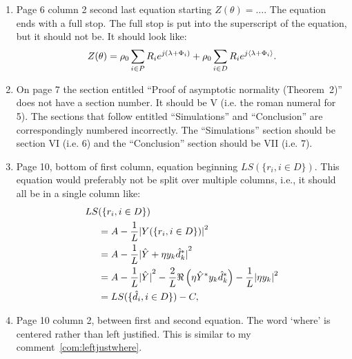 \documentclass[a4paper,10pt]{article}
\begin{document}
\begin{enumerate}
\item Page 6 column 2 second last equation starting $Z(\theta) = \dots$.  The equation ends with a full stop.  The full stop is put into the superscript of the equation, but it should not be.  It should look like:
\[
Z(\theta) = \rho_0 \sum_{i \in P} R_i e^{j(\lambda + \Phi_i)} + \rho_0  \sum_{i \in D} R_i e^{j\langle \lambda + \Phi_i \rangle}.
\]

\item On page 7 the section entitled ``Proof of asymptotic normality (Theorem~2)'' does not have a section number.  It should be V (i.e. the roman numeral for 5).  The sections that follow entitled ``Simulations'' and ``Conclusion'' are correspondingly numbered incorrectly.  The ``Simulations'' section should be section VI (i.e. 6) and the ``Conclusion'' section should be VII (i.e. 7). 

\item Page 10, bottom of first column, equation beginning $LS(\{r_i, i \in D\})$.  This equation would preferably not be split over multiple columns, i.e., it should all be in a single column like:
\begin{align*}
LS&(\{r_i, i \in D\}) \\
&= A - \frac{1}{L} {\vert  Y(\{ r_i, i \in D\})  \vert}^2 \\
&= A - \frac{1}{L} {\vert  \hat{Y} + \eta y_k\hat{d}_k^*  \vert}^2 \\
&= A - \frac{1}{L}{\vert \hat{Y} \vert}^2 - \frac{2}{L}\Re\left(\eta \hat{Y}^* y_k \hat{d}_k^* \right) -  \frac{1}{L}{\vert  \eta y_k \vert}^2\\
&= LS(\{\hat{d}_i, i \in D\}) - C,
\end{align*}

\item Page 10 column 2, between first and second equation.  The word `where' is centered rather than left justified.  This is similar to my comment~\ref{com:leftjustwhere}. 


\end{enumerate}
\end{document}
